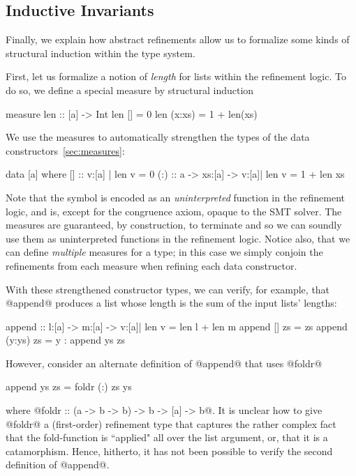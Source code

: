 {{{{\subsection{Inductive Invariants}\label{sec:overview:induction}

Finally, we explain how abstract refinements allow us to formalize 
some kinds of structural induction within the type system. 

 First, let us formalize a notion of \emph{length} for
lists within the refinement logic. To do so, we define a special 
 measure by structural induction
%
\begin{code}
  measure len :: [a] -> Int 
  len []      = 0 
  len (x:xs)  = 1 + len(xs)
\end{code}
%
We use the measures to automatically strengthen the 
types of the data constructors~\ref{sec:measures}:
%
\begin{code}
  data [a] where 
    []  :: {v:[a] | len v = 0}
    (:) :: a -> xs:[a] -> {v:[a]| len v = 1 + len xs}
\end{code}
%
Note that the symbol  is encoded as an \emph{uninterpreted}
function in the refinement logic, and is, except for the congruence axiom,
opaque to the SMT solver. The measures are guaranteed, by construction, 
to terminate and so we can soundly use them as uninterpreted 
functions in the refinement logic. Notice also, that we can define 
\emph{multiple} measures for a type; in this case we simply conjoin 
the refinements from each measure when refining each data constructor.

With these strengthened constructor types, we can verify, for example,
that @append@ produces a list whose length is the sum of the input lists'
lengths:
%
\begin{code}
  append :: l:[a] -> m:[a] -> {v:[a]| len v = len l + len m}
  append []     zs = zs
  append (y:ys) zs = y : append ys zs
\end{code}
%
However, consider an alternate definition of @append@ that uses @foldr@
%
\begin{code}
  append ys zs = foldr (:) zs ys 
\end{code}
%
where @foldr :: (a -> b -> b) -> b -> [a] -> b@.
It is unclear how to give @foldr@ a (first-order) refinement type
that captures the rather complex fact that the fold-function 
is ``applied" all over the list argument, or, that it is a catamorphism.
Hence, hitherto, it has not been possible to verify the second definition 
of @append@.


}}}}

